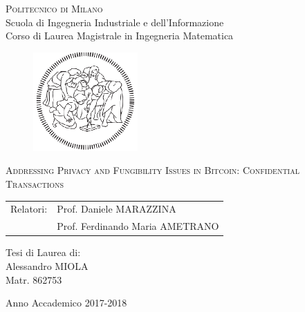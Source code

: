 \begin{titlepage}

	\begin{center}
		\normalsize 
			\textsc{Politecnico di Milano}\\
			Scuola di Ingegneria Industriale e dell'Informazione\\
      		Corso di Laurea Magistrale in Ingegneria Matematica\\
	\end{center}
	\vspace{.6cm}
	
	\begin{figure}[htpb]
		\centering
		\includegraphics[width=4cm]{Cover/polimi}
	\end{figure}
	\vspace{.6cm}
	
	\begin{center}
		\LARGE
			\textsc{Addressing Privacy and Fungibility Issues in Bitcoin: Confidential Transactions}
	\end{center}
	\vspace{1.6cm}

	\begin{flushleft}
		\large
		\begin{tabular}{ll}
		Relatori:    & Prof. Daniele MARAZZINA      \\
		             & Prof. Ferdinando Maria AMETRANO
		\end{tabular}
		\vspace{1cm}
	\end{flushleft}
	
	\begin{flushright}
		\large
		Tesi di Laurea di:\\
		Alessandro MIOLA\\
		Matr. 862753\\		
	\end{flushright}
	
	\vspace*{\fill}
	\begin{center}
		Anno Accademico 2017-2018
	\end{center}
	
\end{titlepage}
